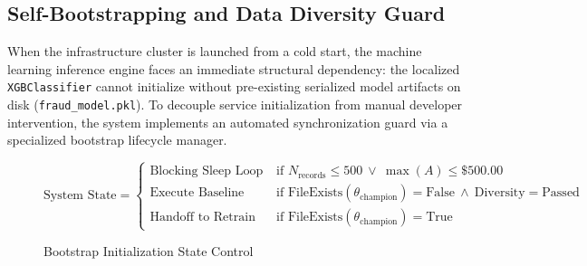 \documentclass[12pt]{report}
\begin{document}
\subsection{Self-Bootstrapping and Data Diversity Guard}
When the infrastructure cluster is launched from a cold start, the machine learning inference engine faces an immediate structural dependency: the localized \texttt{XGBClassifier} cannot initialize without pre-existing serialized model artifacts on disk (\texttt{fraud\_model.pkl}). To decouple service initialization from manual developer intervention, the system implements an automated synchronization guard via a specialized bootstrap lifecycle manager.

\begin{figure}[H]
    \centering
    
    $$
        \text{System State} = 
        \begin{cases} 
            \text{Blocking Sleep Loop} & \text{if } N_{\text{records}} \le 500 \ \lor \ \max(A) \le \$500.00 \\
            \text{Execute Baseline Train} & \text{if } \text{FileExists}(\theta_{\text{champion}}) = \text{False} \ \land \ \text{Diversity} = \text{Passed} \\
            \text{Handoff to Retrain Worker} & \text{if } \text{FileExists}(\theta_{\text{champion}}) = \text{True}
        \end{cases}
    $$
    
    \caption{Bootstrap Initialization State Control}
\end{figure}
\end{document}

